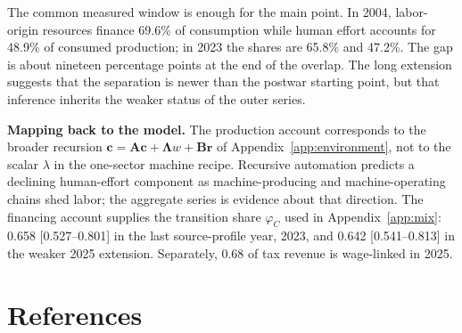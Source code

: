 \documentclass[12pt]{article}
\theoremstyle{plain}
\begin{document}
The common measured window is enough for the main point. In 2004, labor-origin resources finance 69.6\% of consumption while human effort accounts for 48.9\% of consumed production; in 2023 the shares are 65.8\% and 47.2\%. The gap is about nineteen percentage points at the end of the overlap. The long extension suggests that the separation is newer than the postwar starting point, but that inference inherits the weaker status of the outer series.

\textbf{Mapping back to the model.} The production account corresponds to the broader recursion $\mathbf{c}=\mathbf{A}\mathbf{c}+\boldsymbol{\Lambda}w+\mathbf{B}\mathbf{r}$ of Appendix~\ref{app:environment}, not to the scalar $\lambda$ in the one-sector machine recipe. Recursive automation predicts a declining human-effort component as machine-producing and machine-operating chains shed labor; the aggregate series is evidence about that direction. The financing account supplies the transition share $\varphi_C$ used in Appendix~\ref{app:mix}: 0.658 [0.527--0.801] in the last source-profile year, 2023, and 0.642 [0.541--0.813] in the weaker 2025 extension. Separately, 0.68 of tax revenue is wage-linked in 2025.

\section*{References}
\end{document}
